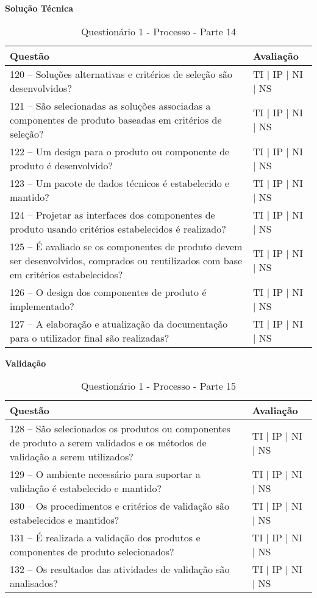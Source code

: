 \documentclass[openany,10pt,a4paper]{article}
\begin{document}
\begin{appendix}
\begin{table}[h]
\textbf{Solução Técnica}
\centering
	\caption{Questionário 1 - Processo - Parte 14}
	\begin{tabular}{p{3.5in}p{2in}}		
		\toprule
		\textbf{Questão}  & \textbf{Avaliação}\\ 
		\midrule
		120 – Soluções alternativas e critérios de seleção são desenvolvidos?
 & TI | IP | NI | NS \\
        \midrule
		121 – São selecionadas as soluções associadas a componentes de produto baseadas em critérios 
de seleção?
 & TI | IP | NI | NS \\
		\midrule
		122 – Um design para o produto ou componente de produto é desenvolvido?
 & TI | IP | NI | NS \\
		\midrule
        123 – Um pacote de dados técnicos é estabelecido e mantido?
 & TI | IP | NI | NS \\
		\midrule
		124 – Projetar as interfaces dos componentes de produto usando critérios estabelecidos é 
realizado? 
  & TI | IP | NI | NS \\
		\midrule
		125 – É avaliado se os componentes de produto devem ser desenvolvidos, comprados ou 
reutilizados com base em critérios estabelecidos? 
 & TI | IP | NI | NS \\
 \midrule
		126 – O design dos componentes de produto é implementado?
 & TI | IP | NI | NS \\
        \midrule
        127 – A elaboração e atualização da documentação para o utilizador final são realizadas?
 & TI | IP | NI | NS \\
		\bottomrule
	\end{tabular} 
	\label{tab:tabela1}
\end{table}

\begin{table}[h]
\textbf{Validação}
	\centering
	\caption{Questionário 1 - Processo - Parte 15}
	\begin{tabular}{p{3.5in}p{2in}}		
		\toprule
		\textbf{Questão}  & \textbf{Avaliação}\\ 
		\midrule
		128 – São selecionados os produtos ou componentes de produto a serem validados e os 
métodos de validação a serem utilizados?
 & TI | IP | NI | NS \\
        \midrule
		129 – O ambiente necessário para suportar a validação é estabelecido e mantido?
 & TI | IP | NI | NS \\
		\midrule
		130 – Os procedimentos e critérios de validação são estabelecidos e mantidos?
 & TI | IP | NI | NS \\
		\midrule
        131 – É realizada a validação dos produtos e componentes de produto selecionados?
 & TI | IP | NI | NS \\
		\midrule
		132 – Os resultados das atividades de validação são analisados?
  & TI | IP | NI | NS \\
		\bottomrule
	\end{tabular} 
	\label{tab:tabela1}
\end{table}


\end{appendix}
\end{document}
